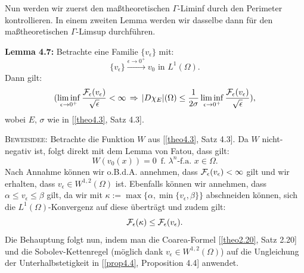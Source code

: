 Nun werden wir zuerst den maßtheoretischen \(\Gamma\)-Liminf durch den Perimeter kontrollieren. In einem zweiten Lemma werden wir dasselbe dann für den maßtheoretischen \(\Gamma\)-Limsup durchführen.\\[0.5cm]
\colorbox{generalYellow}{\begin{minipage}{16cm}{\textcolor{black}{}{\label{lem4.7}}}
\textbf{Lemma 4.7:} Betrachte eine Familie \(\{v_{\epsilon}\}\) mit:
\begin{equation}
    \{v_{\epsilon}\} \stackrel{\epsilon \to 0^+}{\to} v_0 \text{ in } L^1(\Omega).
\end{equation}
Dann gilt:
\begin{equation}
    (\liminf_{\epsilon \to 0^+} \frac{\mathcal{F}_{\epsilon}(v_{\epsilon})}{\sqrt{\epsilon}} < \infty \, \Rightarrow \, |D\chi_E|(\Omega) \leq \frac{1}{2\sigma} \liminf_{\epsilon \to 0^+} \frac{\mathcal{F}_{\epsilon}(v_{\epsilon})}{\sqrt{\epsilon}}),
\end{equation}
wobei \(E, \, \sigma\) wie in [\ref{theo4.3}, Satz 4.3].
\end{minipage}}

\textsc{Beweisidee:} Betrachte die Funktion \(W\) aus [\ref{theo4.3}, Satz 4.3]. Da \(W\) nicht-negativ ist, folgt direkt mit dem Lemma von Fatou, dass gilt:
\begin{equation}
    W(v_0(x)) = 0 \, \text{ f. }\lambda^n \text{-f.a. }x \in \Omega.
\end{equation}
Nach Annahme können wir o.B.d.A. annehmen, dass \(\mathcal{F}_{\epsilon}(v_{\epsilon}) < \infty\) gilt und wir erhalten, dass \(v_{\epsilon} \in W^{1,2}(\Omega)\) ist. Ebenfalls können wir annehmen, dass \(\alpha \leq v_{\epsilon} \leq \beta\) gilt, da wir mit \(\kappa := \max\{\alpha, \min\{v_{\epsilon},\beta\}\}\) abschneiden können, sich die \(L^1(\Omega)\)-Konvergenz auf diese überträgt und zudem gilt:
\begin{equation}
    \mathcal{F}_{\epsilon}(\kappa) \leq \mathcal{F}_{\epsilon}(v_{\epsilon}).
\end{equation}
Die Behauptung folgt nun, indem man die Coarea-Formel [\ref{theo2.20}, Satz 2.20] und die Sobolev-Kettenregel (möglich dank \(v_{\epsilon} \in W^{1,2}(\Omega)\)) auf die Ungleichung der Unterhalbstetigkeit in [\ref{prop4.4}, Proposition 4.4] anwendet. \QEDB

